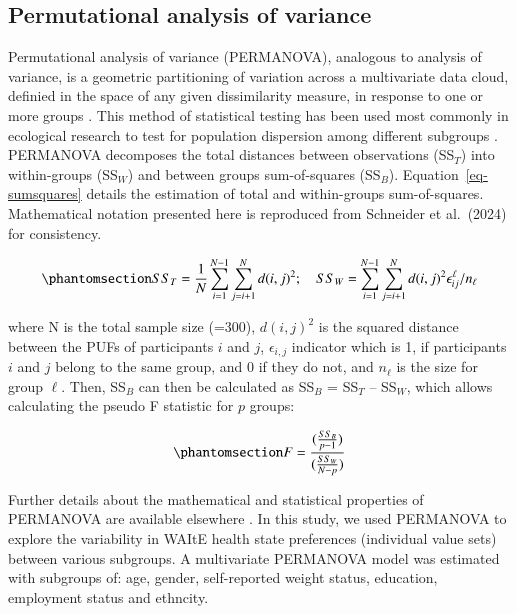 \documentclass[
  number,
  preprint]{elsarticle}
\begin{document}
\subsection{Permutational analysis of
variance}\label{permutational-analysis-of-variance}

Permutational analysis of variance (PERMANOVA), analogous to analysis of
variance, is a geometric partitioning of variation across a multivariate
data cloud, definied in the space of any given dissimilarity measure, in
response to one or more groups
\citep{Anderson2017, Anderson2013PERMANOVATesting}. This method of
statistical testing has been used most commonly in ecological research
to test for population dispersion among different subgroups
\citep{Souza2013PopulationEstuary}. PERMANOVA decomposes the total
distances between observations (SS\(_T\)) into within-groups (SS\(_W\))
and between groups sum-of-squares (SS\(_B\)).
Equation~\ref{eq-sumsquares} details the estimation of total and
within-groups sum-of-squares. Mathematical notation presented here is
reproduced from Schneider et al.~(2024)
\citep{Schneider2024ExploringLevel} for consistency.

\begin{equation}\phantomsection\label{eq-sumsquares}{ 
    SS_{T} = \frac{1}{N}\sum_{i=1}^{N-1}\sum_{j=i+1}^{N}d(i,j)^{2}; \quad SS_{W} = \sum_{i=1}^{N-1}\sum_{j=i+1}^{N}d(i,j)^{2}\epsilon_{ij}^{\ell}/n_{\ell}
}\end{equation}

where N is the total sample size (=300), \(d(i,j)^2\) is the squared
distance between the PUFs of participants \(i\) and \(j\),
\(\epsilon_{i,j}\) indicator which is 1, if participants \(i\) and \(j\)
belong to the same group, and 0 if they do not, and \(n_{\ell}\) is the
size for group \(\ell\). Then, SS\(_B\) can then be calculated as
SS\(_B\) = SS\(_T\) -- SS\(_W\), which allows calculating the pseudo F
statistic for \(p\) groups:

\begin{equation}\phantomsection\label{eq-ssb}{
F= \frac{(\frac{SS_B}{p-1})}{(\frac{SS_W}{N-p})}
}\end{equation}

Further details about the mathematical and statistical properties of
PERMANOVA are available elsewhere
\citep{Schneider2024ExploringLevel, Anderson2017, Anderson2013PERMANOVATesting}.
In this study, we used PERMANOVA to explore the variability in WAItE
health state preferences (individual value sets) between various
subgroups. A multivariate PERMANOVA model was estimated with subgroups
of: age, gender, self-reported weight status, education, employment
status and ethncity.
\end{document}
